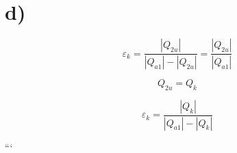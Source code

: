 

\section*{d)}

\[
\varepsilon_k = \frac{|Q_{2u}|}{|Q_{a1}| - |Q_{2u}|} = \frac{|Q_{2u}|}{|Q_{a1}|}
\]

\[
Q_{2u} = Q_k
\]

\[
\varepsilon_k = \frac{|Q_k|}{|Q_{a1}| - |Q_k|}
\]

```